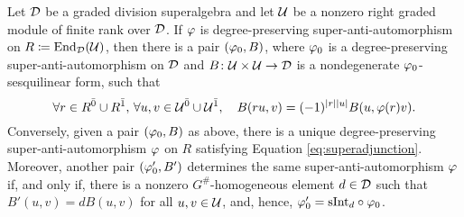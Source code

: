 \begin{thm}\label{thm:vphi-iff-vphi0-and-B}
	Let $\mathcal{D}$ be a graded division superalgebra and let $\mathcal U$ be a nonzero right graded module of finite rank over $\mathcal{D}$.
	If $\varphi$ is degree-preserving super-anti-automorphism on $R \coloneqq \operatorname{End}_{\mathcal{D}}(\mathcal U)$, then there is a pair $(\varphi_0, B)$, where $\varphi_0$ is a degree-preserving super-anti-automorphism on $\mathcal{D}$ and $B\colon \mathcal U \times \mathcal U \to \mathcal{D}$ is a nondegenerate $\varphi_0$-sesquilinear form, such that
	\begin{equation}\label{eq:superadjunction}
		\forall r\in R^{\bar0} \cup R^{\bar1},\,\forall u, v \in \mathcal U^{\bar0} \cup \mathcal U^{\bar1},  \quad B(ru,v) = (-1)^{|r||u|} B(u,\varphi(r)v).
	\end{equation}
	Conversely, given a pair $(\varphi_0, B)$ as above, there is a unique degree-preserving super-anti-automorphism $\varphi$ on $R$ satisfying Equation \eqref{eq:superadjunction}.
	Moreover, another pair $(\varphi_0', B')$ determines the same super-anti-automorphism $\varphi$ if, and only if, there is a nonzero $G^\#$-homogeneous element $d\in \mathcal{D}$ such that $B'(u, v) = dB (u, v)$ for all $u, v \in \mathcal U$, and, hence, $\varphi_0' = \mathrm{sInt}_d \circ \varphi_0$.
\end{thm}

